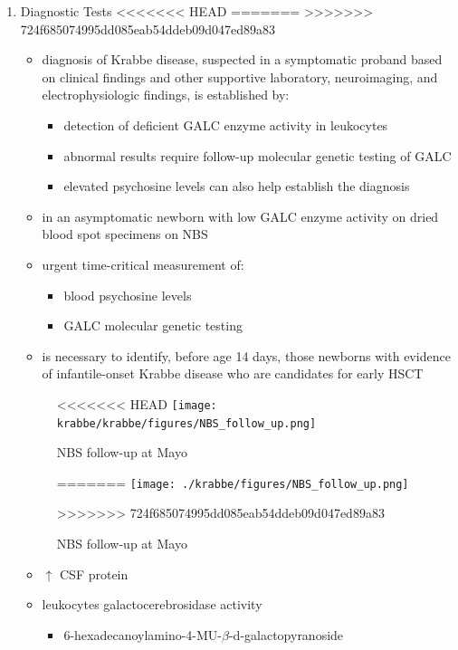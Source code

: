 \documentclass[fontsize=12pt]{scrartcl}
\begin{document}
\begin{enumerate}
\begin{enumerate}
\begin{enumerate}
\begin{enumerate}
\begin{table}[htbp]
\begin{enumerate}
\begin{enumerate}
\begin{table}[htbp]
\begin{enumerate}
\begin{itemize}
\begin{itemize}
\begin{enumerate}
\begin{enumerate}
\begin{enumerate}
\item Diagnostic Tests
<<<<<<< HEAD
\label{sec:org9fb4261}
=======
\label{sec:org17c7f48}
>>>>>>> 724f685074995dd085eab54ddeb09d047ed89a83
\begin{itemize}
\item diagnosis of Krabbe disease, suspected in a symptomatic proband
based on clinical findings and other supportive laboratory,
neuroimaging, and electrophysiologic findings, is established by:
\begin{itemize}
\item detection of deficient GALC enzyme activity in leukocytes
\item abnormal results require follow-up molecular genetic testing of GALC
\item elevated psychosine levels can also help establish the diagnosis
\end{itemize}

\item in an asymptomatic newborn with low GALC enzyme activity
on dried blood spot specimens on NBS
\item urgent time-critical measurement of:
\begin{itemize}
\item blood psychosine levels
\item GALC molecular genetic testing
\end{itemize}
\item is necessary to identify, before age 14 days, those newborns with
evidence of infantile-onset Krabbe disease who are candidates for
early HSCT
\end{itemize}

\begin{figure}[htbp]
\centering
<<<<<<< HEAD
\texttt{[image: krabbe/krabbe/figures/NBS\_follow\_up.png]}
\caption{\label{fig:orgdb84af8}NBS follow-up at Mayo}
=======
\texttt{[image: ./krabbe/figures/NBS\_follow\_up.png]}
\caption{\label{fig:orgfb707a7}
NBS follow-up at Mayo}
>>>>>>> 724f685074995dd085eab54ddeb09d047ed89a83
\end{figure}

\begin{itemize}
\item \(\uparrow\) CSF protein
\item leukocytes galactocerebrosidase activity 
\begin{itemize}
\item 6-hexadecanoylamino-4-MU-\(\beta\)-d-galactopyranoside
\end{itemize}


\end{itemize}
\end{enumerate}
\end{enumerate}
\end{enumerate}
\end{itemize}
\end{itemize}
\end{enumerate}
\end{table}
\end{enumerate}
\end{enumerate}
\end{table}
\end{enumerate}
\end{enumerate}
\end{enumerate}
\end{enumerate}
\end{document}
